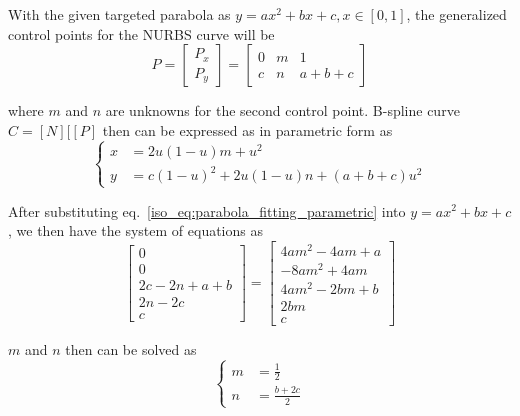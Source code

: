 With the given targeted parabola as $y=ax^2+bx+c,x \in [0,1]$, the generalized control points for the NURBS curve will be
    \begin{equation}
        P= \begin{bmatrix}
            P_x \\
            P_y
        \end{bmatrix} = \begin{bmatrix}
            0 & m & 1 \\
            c & n & a+b+c
        \end{bmatrix}
    \end{equation}

where $m$ and $n$ are unknowns for the second control point.
B-spline curve $C=[N][[P]$ then can be expressed as in parametric form as
    \begin{equation}
        \left\{
        \begin{aligned}
            x &= 2u(1-u)m + u^2 \\
            y &= c(1-u)^2 + 2u(1-u)n + (a+b+c)u^2
        \end{aligned}
        \right.
    \label{iso_eq:parabola_fitting_parametric}
    \end{equation}

After substituting eq.~\ref{iso_eq:parabola_fitting_parametric} into $y=ax^2+bx+c$, we then have the system of equations as
    \begin{equation}
        \begin{bmatrix}
            0 \\
            0 \\
            2c - 2n +a +b \\
            2n - 2c \\
            c
        \end{bmatrix} = 
        \begin{bmatrix}
            4am^2-4am+a \\
            -8am^2 + 4am \\
            4am^2 -2bm +b \\
            2bm \\
            c
        \end{bmatrix}
    \end{equation}

$m$ and $n$ then can be solved as
    \begin{equation}
        \left\{
        \begin{aligned}
            m &= \frac{1}{2} \\
            n &= \frac{b+2c}{2}
        \end{aligned}
        \right.
    \end{equation}


